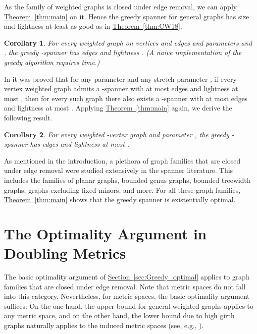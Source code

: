 \documentclass[11pt,letterpaper]{article}
\newtheorem{corollary}{Corollary}
\newcommand{\namedref}[2]{\hyperref[#2]{#1~\ref*{#2}}}
\newcommand{\sectionref}[1]{\namedref{Section}{#1}}
\newcommand{\theoremref}[1]{\namedref{Theorem}{#1}}
\begin{document}
As the family of weighted graphs is closed under edge removal, we can apply \theoremref{thm:main} on it.
Hence the greedy spanner for general graphs has size and lightness at least as good as in \theoremref{thm:CW18}.
\begin{corollary}\label{cor:Greedy_CW}
	For every weighted graph  on  vertices and  edges and parameters  and , the greedy
	-spanner has  edges and lightness .
	(A naive implementation of the greedy algorithm requires  time.)
\end{corollary}	

In \cite{BFN19} it was proved that for any parameter  and any stretch parameter ,
if every  -vertex weighted graph  admits a -spanner with at most  edges and lightness  at most , then for every such graph
there also exists a -spanner with at most  edges and lightness at most  .
Applying \theoremref{thm:main} again, we derive the following result.
\begin{corollary}\label{cor:light_Greedy}
	For every weighted -vertex graph  and parameter ,
	the greedy -spanner has  edges and lightness at most .
\end{corollary}	

As mentioned in the introduction, a plethora of graph families that are closed under edge removal were studied extensively in the spanner literature.
This includes the families of planar graphs, bounded genus graphs, bounded treewidth graphs, graphs excluding fixed minors, and more.
For all these graph families, \theoremref{thm:main} shows that the greedy spanner is existentially optimal.




\section{The Optimality Argument in Doubling Metrics}\label{sec:doubling}
The basic optimality argument of \sectionref{sec:Greedy_optimal} applies to graph families that are closed under edge removal.
Note that metric spaces do not fall into this category.
Nevertheless, for metric spaces, the basic optimality argument suffices: On the one hand, the upper bound for general weighted graphs applies to any metric space,
and on the other hand, the lower bound due to high girth graphs naturally applies to the induced metric spaces (see, e.g., \cite{ADDJS93,RR98}).
\end{document}
